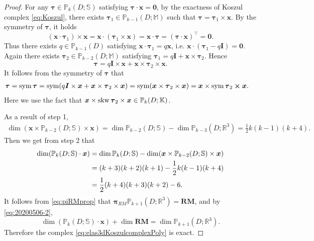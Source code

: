 \begin{proof}
\medskip
{}

For any $\boldsymbol \tau\in\mathbb P_k(D;\mathbb S)$ satisfying $\boldsymbol \tau\cdot \boldsymbol x=\boldsymbol  0$, by the exactness of Koszul complex \eqref{eq:Koszul}, there exists $\boldsymbol \tau_1\in \mathbb P_{k-1}(D;\mathbb M)$ such that $\boldsymbol\tau=\boldsymbol\tau_1\times\boldsymbol x$. By the symmetry of $\boldsymbol \tau$, it holds
\[
(\boldsymbol  x\cdot \boldsymbol  \tau_1)\times\boldsymbol x= \boldsymbol  x\cdot (\boldsymbol  \tau_1\times\boldsymbol x)
=\boldsymbol  x\cdot \boldsymbol\tau=(\boldsymbol\tau\cdot \boldsymbol x)^{\intercal}= \boldsymbol0.
\]
Thus there exists $q\in\mathbb P_{k-1}(D)$ satisfying $\boldsymbol  x\cdot \boldsymbol  \tau_1=q\boldsymbol x$, i.e. $\boldsymbol  x\cdot (\boldsymbol\tau_1 -q\boldsymbol I)=\boldsymbol 0$. Again there exists $\boldsymbol\tau_2\in\mathbb P_{k-2}(D;\mathbb M)$ satisfying $\boldsymbol\tau_1=q\boldsymbol I + \boldsymbol x\times \boldsymbol\tau_2$. Hence
\[
\boldsymbol\tau=q\boldsymbol I\times\boldsymbol x + \boldsymbol x\times  \boldsymbol\tau_2 \times \boldsymbol x.
\]
It follows from the symmetry of $\boldsymbol\tau$ that
\begin{align*}
\boldsymbol\tau&=\operatorname{sym}\boldsymbol\tau=\operatorname{sym}(q\boldsymbol I\times\boldsymbol x + \boldsymbol x\times  \boldsymbol\tau_2 \times \boldsymbol x)= \operatorname{sym}(\boldsymbol x\times \boldsymbol\tau_2 \times \boldsymbol x) =\boldsymbol x\times\operatorname{sym}\boldsymbol\tau_2 \boldsymbol  \times \boldsymbol  x.
\end{align*}
Here we use the fact that $\boldsymbol x\times\operatorname{skw}\boldsymbol\tau_2\times \boldsymbol  x \in\mathbb P_{k}(D;\mathbb K)$.

\medskip
{}

As a result of step 1,
\begin{align*}
\dim(\boldsymbol x\times\mathbb P_{k-2}(D;\mathbb S)\times \boldsymbol  x)=\dim\mathbb P_{k-2}(D;\mathbb S)-\dim\mathbb P_{k-3}(D;\mathbb R^3) =\frac{1}{2}k(k-1)(k+4). 
\end{align*}
Then we get from step 2 that 
\begin{align}
\dim(\mathbb P_{k}(D;\mathbb S)\cdot \boldsymbol x)&=\dim\mathbb P_{k}(D;\mathbb S)-\dim(\boldsymbol x\times\mathbb P_{k-2}(D;\mathbb S) \times \boldsymbol  x)\notag\\
&=(k+3)(k+2)(k+1)-\frac{1}{2}k(k-1)(k+4) \notag\\
&=\frac{1}{2}(k+4)(k+3)(k+2)-6. \label{eq:20200506-2}
\end{align}
It follows from \eqref{eq:piRMprop} that $\boldsymbol \pi_{RM}\mathbb P_{k+1}(D;\mathbb R^3)=\boldsymbol{RM}$, and by \eqref{eq:20200506-2},
\[
\dim(\mathbb P_{k}(D;\mathbb S)\cdot \boldsymbol x)+\dim\boldsymbol{RM}=\dim\mathbb P_{k+1}(D;\mathbb R^3).
\]
Therefore the complex \eqref{eq:elas3dKoszulcomplexPoly} is exact.
\end{proof}

